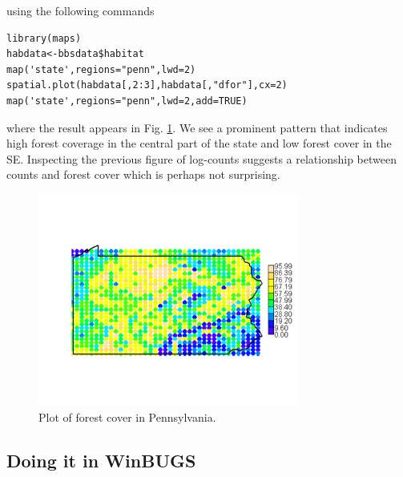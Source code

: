 using the following commands
{\small
\begin{verbatim}
library(maps)
habdata<-bbsdata$habitat
map('state',regions="penn",lwd=2)
spatial.plot(habdata[,2:3],habdata[,"dfor"],cx=2)
map('state',regions="penn",lwd=2,add=TRUE)
\end{verbatim}
}
where the result appears in Fig. \ref{glms.fig.paforest}.
We see a prominent pattern that indicates high forest coverage in the
central part of the state and low forest cover in the SE.  Inspecting
the previous figure of log-counts suggests a relationship between
counts and forest cover which is perhaps not surprising.
\begin{figure}
\begin{center}
\includegraphics[height=2.75in]{Ch2-Bayes/figs/PA2}
\end{center}
\caption{Plot of forest cover in Pennsylvania.}
\label{glms.fig.paforest}
\end{figure}

\subsection{Doing it in WinBUGS}

